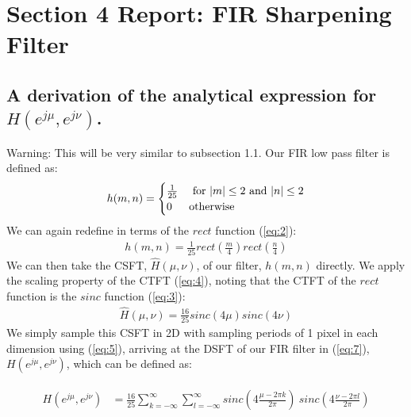 \documentclass{article}
\begin{document}
\newpage
\section{Section 4 Report: FIR Sharpening Filter}

\subsection{A derivation of the analytical expression for $H(e^{j \mu}, e^{j \nu})$.}
Warning: This will be very similar to subsection 1.1.
Our FIR low pass filter is defined as:
\begin{align}\label{eq:7}
h(m,n) =
    \begin{cases} 
    \frac{1}{25}& $ for $ |m| \leq 2 $ and $ |n| \leq 2 \\
    0 & $otherwise$
    \end{cases}
\end{align}
We can again redefine in terms of the $rect$ function (\ref{eq:2}):
\begin{align*}
    h(m,n) = \frac{1}{25} rect(\frac{m}{4}) rect(\frac{n}{4})
\end{align*}
We can then take the CSFT, $\hat{H}(\mu, \nu)$, of our filter, $h(m, n)$ directly. We apply the scaling property of the CTFT (\ref{eq:4}), noting that the CTFT of the $rect$ function is the $sinc$ function (\ref{eq:3}):
\begin{align}\label{eq:8}
    \hat{H}(\mu, \nu) = \frac{16}{25} sinc(4 \mu) sinc(4 \nu)
\end{align}
We simply sample this CSFT in 2D with sampling periods of 1 pixel in each dimension using (\ref{eq:5}), arriving at the DSFT of our FIR filter in (\ref{eq:7}), $H(e^{j \mu}, e^{j \nu})$, which can be defined as:
\begin{tcolorbox}[colback=red!5!white,colframe=red!75!black]
\begin{align}\label{eq:9}
    \begin{split}
        H(e^{j \mu}, e^{j \nu}) &= \frac{16}{25}\sum_{k=-\infty}^{\infty} \sum_{l=-\infty}^{\infty} sinc(4 \frac{\mu - 2 \pi k}{2 \pi}) \ sinc(4 \frac{\nu - 2 \pi l}{2 \pi})
    \end{split}
\end{align}
\end{tcolorbox}
\end{document}
